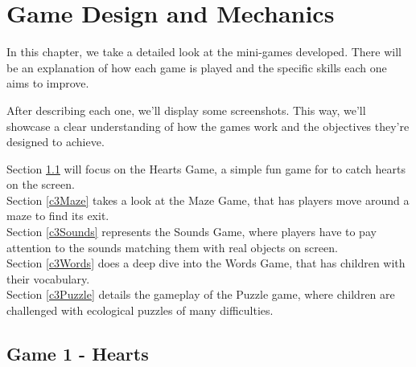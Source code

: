 \raggedbottom
\chapter{Game Design and Mechanics}
\label{cha:games_to_be_developed}


In this chapter, we take a detailed look at the mini-games developed. There will be an explanation of how each game is played and the specific skills each one aims to improve.

After describing each one, we'll display some screenshots. This way, we'll showcase a clear understanding of how the games work and the objectives they’re designed to achieve.

Section \ref{c3hearts} will focus on the Hearts Game, a simple fun game for to catch hearts on the screen.
\\Section \ref{c3Maze} takes a look at the Maze Game, that has players move around a maze to find its exit.
\\Section \ref{c3Sounds} represents the Sounds Game, where players have to pay attention to the sounds matching them with real objects on screen.
\\Section \ref{c3Words} does a deep dive into the Words Game, that has children with their vocabulary.
\\Section \ref{c3Puzzle} details the gameplay of the Puzzle game, where children are challenged with ecological puzzles of many difficulties.



\newpage
\section{Game 1 - Hearts}
\label{c3hearts}

